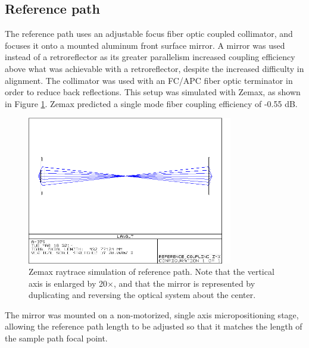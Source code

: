 \subsection{Reference path}
\label{sec:reference_path}


The reference path uses an adjustable focus fiber optic coupled collimator, and focuses it onto a mounted aluminum front surface mirror. A mirror was used instead of a retroreflector as its greater parallelism increased coupling efficiency above what was achievable with a retroreflector, despite the increased difficulty in alignment. The collimator was used with an FC/APC fiber optic terminator in order to reduce back reflections. %
This setup was simulated with Zemax, as shown in Figure \ref{fig:reference_zemax}. Zemax predicted a single mode fiber coupling efficiency of -0.55 dB.%

\begin{figure}[h!]
\centering
\includegraphics[width=0.8\textwidth]{Images/Zemax/RP-raytrace.png}
\caption[Zemax raytrace simulation of reference path.]{Zemax raytrace simulation of reference path. Note that the vertical axis is enlarged by 20$\times$, and that the mirror is represented by duplicating and reversing the optical system about the center.\label{fig:reference_zemax}}
\end{figure}

The mirror was mounted on a non-motorized, single axis micropositioning stage, allowing the reference path length to be adjusted so that it matches the length of the sample path focal point.

